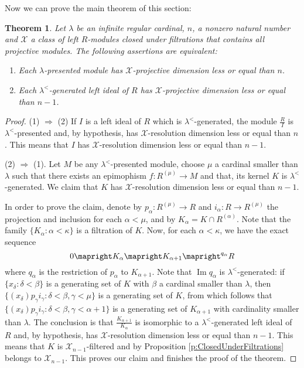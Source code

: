 \documentclass[a4paper,10pt]{amsart}
\newtheorem{theorem}[definition]{Theorem}
\begin{document}
Now we can prove the main theorem of this section:

\begin{theorem}
  Let $\lambda$ be an infinite regular cardinal, $n$, a nonzero
  natural number and $\mathcal X$ a class of left $R$-modules closed under
  filtrations that contains all projective modules. The following
  assertions are equivalent:
  \begin{enumerate}
  \item Each $\lambda$-presented module has $\mathcal X$-projective
    dimension less or equal than $n$.

  \item Each $\lambda^<$-generated left ideal of $R$ has $\mathcal
    X$-projective dimension less or equal than $n-1$.
  \end{enumerate}
\end{theorem}

\begin{proof}
  (1) $\Rightarrow$ (2) If $I$ is a left ideal of $R$ which is
  $\lambda^<$-generated, the module $\frac{R}{I}$ is
  $\lambda^<$-presented and, by hypothesis, has $\mathcal X$-resolution
  dimension less or equal than $n$. This means that $I$ has $\mathcal
  X$-resolution dimension less or equal than $n-1$.

  (2) $\Rightarrow$ (1). Let $M$ be any $\lambda^<$-presented module,
  choose $\mu$ a cardinal smaller than $\lambda$ such that there
  exists an epimophism $f:R^{(\mu)} \rightarrow M$ and that, its
  kernel $K$ is $\lambda^<$-generated. We claim that $K$ has $\mathcal
  X$-resolution dimension less or equal than $n-1$.

  In order to prove the claim, denote by $p_\alpha:R^{(\mu)}
  \rightarrow R$ and $i_\alpha:R \rightarrow R^{(\mu)}$ the
  projection and inclusion for each $\alpha < \mu$, and
  by $K_\alpha = K \cap R^{(\alpha)}$. Note that the family
  $\{K_\alpha:\alpha < \kappa\}$ is a filtration of $K$. Now, for each
  $\alpha < \kappa$, we have the exact sequence
  \begin{displaymath}
    0 \mapright K_\alpha \mapright K_{\alpha+1}
    \mapright^{q_{\alpha}} R
  \end{displaymath}
  where $q_{\alpha}$ is the restriction of $p_\alpha$ to
  $K_{\alpha+1}$. Note that $\operatorname{Im} q_{\alpha}$ is $\lambda^<$-generated: if
  $\{x_\delta:\delta < \beta\}$ is a generating set of $K$ with
  $\beta$ a cardinal smaller than $\lambda$, then
  $\{(x_\delta)p_\gamma i_\gamma:\delta < \beta, \gamma < \mu\}$ is a
  generating set of $K$, from which follows that $\{(x_\delta)p_\gamma
  i_\gamma:\delta < \beta, \gamma < \alpha+1\}$ is a generating set of
  $K_{\alpha+1}$ with cardinality smaller than $\lambda$. The
  conclusion is that $\frac{K_{\alpha+1}}{K_\alpha}$ is isomorphic to
  a $\lambda^<$-generated left ideal of $R$ and, by hypothesis, has
  $\mathcal X$-resolution dimension less or equal than $n-1$. This
  means that $K$ is $\mathcal X_{n-1}$-filtered and by Proposition
  \ref{p:ClosedUnderFiltrations} belongs to $\mathcal X_{n-1}$. This
  proves our claim and finishes the proof of the theorem.
\end{proof}
\end{document}
